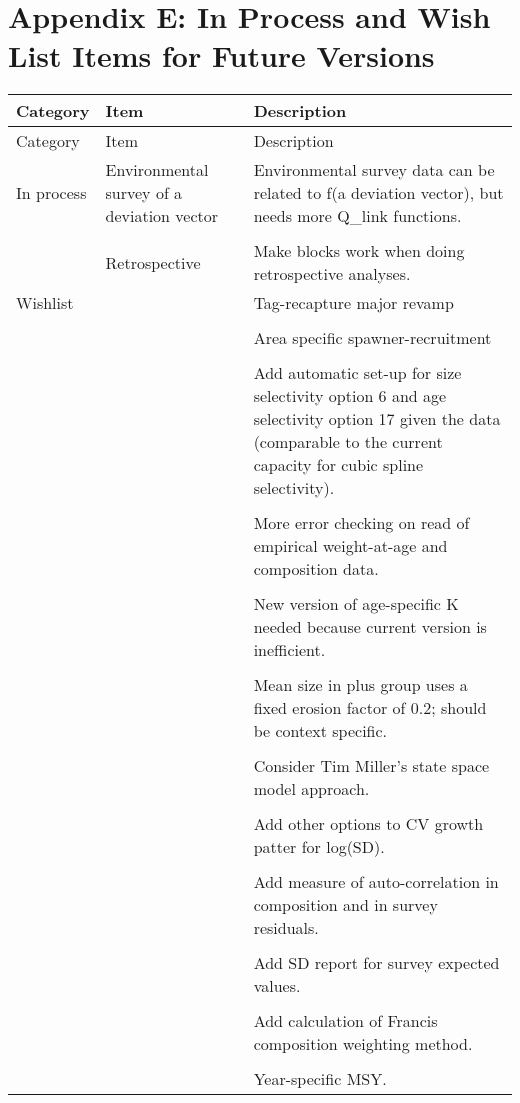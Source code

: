 \section{Appendix E: In Process and Wish List Items for Future Versions}

\begin{center}
	\begin{longtable}{p{2cm} p{3cm} p{10cm}}
		Category & Item & Description\\
		\hline
		\endfirsthead
				
		Category & Item & Description\\
		\hline
		\endhead
				
		\hline
		\endfoot
				
		\endlastfoot
		
		In process 
		  &	Environmental survey of a deviation vector & Environmental survey data can be related to f(a deviation vector), but needs more Q\_link functions.\\
		  \\
		  & Retrospective & Make blocks work when doing retrospective analyses. \\
		
		\hline
		Wishlist & &
			 Tag-recapture major revamp\\\\
	     & & Area specific spawner-recruitment \\\\
	     & & Add automatic set-up for size selectivity option 6 and age selectivity option 17 given the data (comparable to the current capacity for cubic spline selectivity).\\\\
	     & & More error checking on read of empirical weight-at-age and composition data. \\\\
	     & & New version of age-specific K needed because current version is inefficient.\\\\
	     & & Mean size in plus group uses a fixed erosion factor of 0.2; should be context specific. \\\\
	     & & Consider Tim Miller's state space model approach. \\\\
	     & & Add other options to CV growth patter for log(SD). \\\\
	     & & Add measure of auto-correlation in composition and in survey residuals.\\\\
	     & & Add SD report for survey expected values. \\\\
	     & & Add calculation of Francis composition weighting method. \\\\
	     & & Year-specific MSY.	     	   \\	  	  				
		\hline
	\end{longtable}
\end{center}

